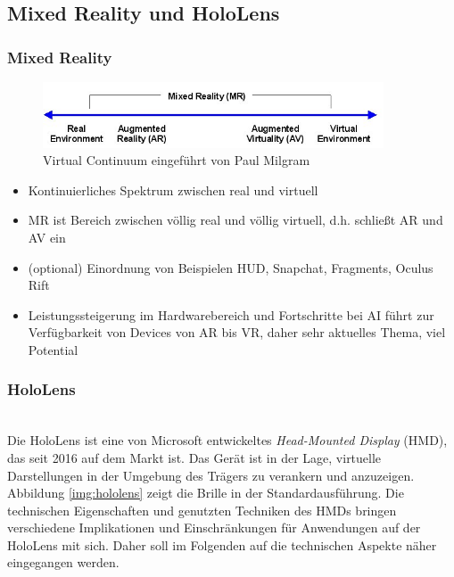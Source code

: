 \subsection{Mixed Reality und HoloLens}
\label{sec-2-1}

\subsubsection{Mixed Reality}
\label{sec-2-1-1}

\begin{figure}[h!]
	\centering
	\includegraphics[width=0.9\textwidth]{images/virtual_continuum.png}
	\caption{Virtual Continuum eingeführt von Paul Milgram \cite{Milgram94}}
	\label{img:virtual_continuum}
\end{figure}

\begin{itemize}
	\item Kontinuierliches Spektrum zwischen real und virtuell
	\item MR ist Bereich zwischen völlig real und völlig virtuell, d.h. schließt AR und AV ein
	\item (optional) Einordnung von Beispielen HUD, Snapchat, Fragments, Oculus Rift
	\item Leistungssteigerung im Hardwarebereich und Fortschritte bei AI führt zur Verfügbarkeit von Devices von AR bis VR, daher sehr aktuelles Thema, viel Potential
\end{itemize}


\subsubsection{HoloLens}
\label{sec-2-1-2}
\\

Die HoloLens ist eine von Microsoft entwickeltes \textit{Head-Mounted Display} (HMD), das seit 2016 auf dem Markt ist. Das Gerät ist in der Lage, virtuelle Darstellungen in der Umgebung des Trägers zu verankern und anzuzeigen. Abbildung \ref{img:hololens} zeigt die Brille in der Standardausführung. Die technischen Eigenschaften und genutzten Techniken des HMDs bringen verschiedene Implikationen und Einschränkungen für Anwendungen auf der HoloLens mit sich. Daher soll im Folgenden auf die technischen Aspekte näher eingegangen werden.\\

